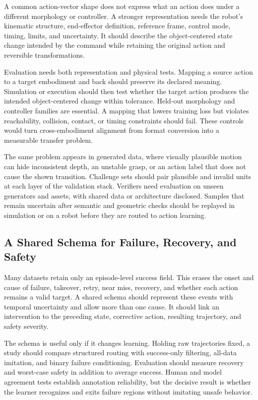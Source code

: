 A common action-vector shape does not express what an action does under a different morphology or controller. A stronger representation needs the robot's kinematic structure, end-effector definition, reference frame, control mode, timing, limits, and uncertainty. It should describe the object-centered state change intended by the command while retaining the original action and reversible transformations.

Evaluation needs both representation and physical tests. Mapping a source action to a target embodiment and back should preserve its declared meaning. Simulation or execution should then test whether the target action produces the intended object-centered change within tolerance. Held-out morphology and controller families are essential. A mapping that lowers training loss but violates reachability, collision, contact, or timing constraints should fail. These controls would turn cross-embodiment alignment from format conversion into a measurable transfer problem.

The same problem appears in generated data, where visually plausible motion can hide inconsistent depth, an unstable grasp, or an action label that does not cause the shown transition. Challenge sets should pair plausible and invalid units at each layer of the validation stack. Verifiers need evaluation on unseen generators and assets, with shared data or architecture disclosed. Samples that remain uncertain after semantic and geometric checks should be replayed in simulation or on a robot before they are routed to action learning.

\subsection{A Shared Schema for Failure, Recovery, and Safety}

Many datasets retain only an episode-level success field. This erases the onset and cause of failure, takeover, retry, near miss, recovery, and whether each action remains a valid target. A shared schema should represent these events with temporal uncertainty and allow more than one cause. It should link an intervention to the preceding state, corrective action, resulting trajectory, and safety severity.

The schema is useful only if it changes learning. Holding raw trajectories fixed, a study should compare structured routing with success-only filtering, all-data imitation, and binary failure conditioning. Evaluation should measure recovery and worst-case safety in addition to average success. Human and model agreement tests establish annotation reliability, but the decisive result is whether the learner recognizes and exits failure regions without imitating unsafe behavior.

